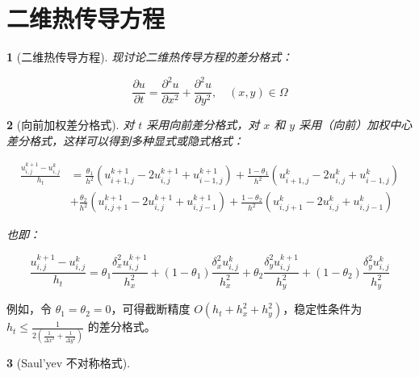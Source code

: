 \documentclass[zihao=5,UTF8]{report}
\theoremstyle{MyTheoremStyle} %
\theoremstyle{MySubsubsectionStyle} %
\newtheorem{definition}{}
\begin{document}
\section{二维热传导方程}


\begin{definition}[二维热传导方程]

现讨论二维热传导方程的差分格式：

\begin{equation}
    \frac{\partial u}{\partial t}=\frac{\partial^2u}{\partial x^2}+\frac{\partial^2u}{\partial y^2},\quad(x,y)\in\Omega 
\end{equation}

\end{definition}


\begin{definition}[向前加权差分格式]

对 $t$ 采用向前差分格式，对 $x$ 和 $y$ 采用（向前）加权中心差分格式，这样可以得到多种显式或隐式格式：

\begin{equation}
    \begin{aligned}
        \frac{u_{i,j}^{k+1}-u_{i,j}^{k}}{h_t}& =\frac{\theta_{1}}{h^{2}}(u_{i+1,j}^{k+1}-2u_{i,j}^{k+1}+u_{i-1,j}^{k+1})+\frac{1-\theta_{1}}{h^{2}}(u_{i+1,j}^{k}-2u_{i,j}^{k}+u_{i-1,j}^{k})  \\
        &+\frac{\theta_{2}}{h^{2}}(u_{i,j+1}^{k+1}-2u_{i,j}^{k+1}+u_{i,j-1}^{k+1})+\frac{1-\theta_{2}}{h^{2}}(u_{i,j+1}^{k}-2u_{i,j}^{k}+u_{i,j-1}^{k})
    \end{aligned}
\end{equation}

也即：

\begin{equation}
    \frac{u_{i,j}^{k+1}-u_{i,j}^{k}}{h_t} = \theta_1\frac{\delta^2_x u_{i,j}^{k+1}}{h_x^2} + (1- \theta_1)\frac{\delta^2_x u_{i,j}^{k}}{h_x^2} + \theta_2\frac{\delta^2_y u_{i,j}^{k+1}}{h_y^2} + (1- \theta_2)\frac{\delta^2_y u_{i,j}^{k}}{h_y^2}
\end{equation}

\end{definition}

例如，令 $\theta_1 = \theta_2 = 0$，可得截断精度 $O(h_t + h_x^2 + h_y^2)$，稳定性条件为 $h_t\leqslant\frac{1}{2\left(\frac{1}{\Delta x^{2}}+\frac{1}{\Delta y^{2}}\right)}$ 的差分格式。


\begin{definition}[Saul'yev 不对称格式]
\end{definition}
\end{document}
